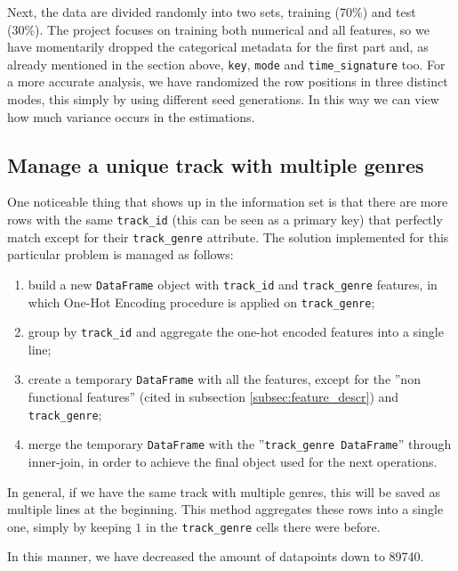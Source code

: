 \documentclass{article}
\begin{document}
Next, the data are divided randomly into two sets, training (70\%) and test (30\%).
The project focuses on training both numerical and all features, so we have momentarily dropped the categorical metadata for the first part and, as already mentioned in the section above, \texttt{key}, \texttt{mode} and \texttt{time\_signature} too. 
For a more accurate analysis, we have randomized the row positions in three distinct modes, this simply by using different seed generations. In this way we can view how much variance occurs in the estimations.


\subsection{Manage a unique track with multiple genres}
\label{subsec:track_genre}
One noticeable thing that shows up in the information set is that there are more rows with the same \texttt{track\_id} (this can be seen as a primary key) that perfectly match except for their \texttt{track\_genre} attribute. 
The solution implemented for this particular problem is managed as follows:
\begin{enumerate}
	\item build a new \texttt{DataFrame} object with \texttt{track\_id} and \texttt{track\_genre} features, in which One-Hot Encoding procedure is applied on \texttt{track\_genre}; 
	\item group by \texttt{track\_id} and aggregate the one-hot encoded features into a single line;
	\item create a temporary \texttt{DataFrame} with all the features, except for the ''non functional features'' (cited in subsection \ref{subsec:feature_descr}) and \texttt{track\_genre};
	\item merge the temporary \texttt{DataFrame} with the ''\texttt{track\_genre DataFrame}'' through inner-join, in order to achieve the final object used for the next operations.
	              
\end{enumerate}
In general, if we have the same track with multiple genres, this will be saved as multiple lines at the beginning. This method aggregates these rows into a single one, simply by keeping $1$ in the \texttt{track\_genre} cells there were before. 
    
In this manner, we have decreased the amount of datapoints down to 89740.
\end{document}
